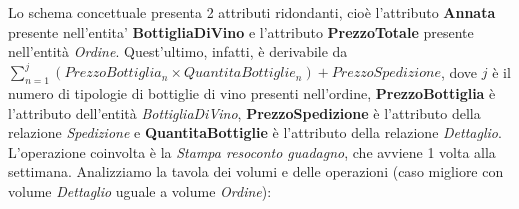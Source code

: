 Lo schema concettuale presenta 2 attributi ridondanti, cioè l'attributo \textbf{Annata} presente nell'entita' \textbf{BottigliaDiVino} e l'attributo \textbf{PrezzoTotale} presente nell'entità \emph{Ordine}. Quest'ultimo, infatti, è derivabile da $\sum_{n = 1}^{j} (PrezzoBottiglia_n \times QuantitaBottiglie_n) + PrezzoSpedizione$, 
dove $j$ è il numero di tipologie di bottiglie di vino presenti nell'ordine,
\textbf{PrezzoBottiglia} è l'attributo dell'entità \emph{BottigliaDiVino}, \textbf{PrezzoSpedizione} è l'attributo della relazione \emph{Spedizione} e \textbf{QuantitaBottiglie} è l'attributo della relazione \emph{Dettaglio}. L'operazione coinvolta è la \emph{Stampa resoconto guadagno}, che avviene 1 volta alla settimana. Analizziamo la tavola dei volumi e delle operazioni (caso migliore con volume \emph{Dettaglio} uguale a volume \emph{Ordine}):


